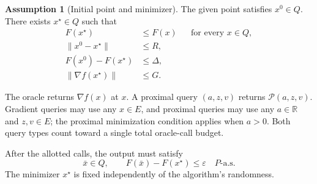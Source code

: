 \documentclass[10pt]{article}
\theoremstyle{definition}
\newtheorem{assumption}{Assumption}
\begin{document}
\begin{assumption}[Initial point and minimizer]
The given point satisfies $x^0\in Q$. There exists $x^\star\in Q$ such that
\[
\begin{aligned}
F(x^\star)&\leq F(x) &&\text{for every }x\in Q,\\
\|x^0-x^\star\|&\leq R,\\
F(x^0)-F(x^\star)&\leq\Delta,\\
\|\nabla f(x^\star)\|&\leq G.
\end{aligned}
\]
\end{assumption}

The oracle returns $\nabla f(x)$ at $x$. A proximal query $(a,z,v)$ returns $\mathcal{P}(a,z,v)$. Gradient queries may use any $x\in E$, and proximal queries may use any $a\in\mathbb{R}$ and $z,v\in E$; the proximal minimization condition applies when $a>0$. Both query types count toward a single total oracle-call budget.

After the allotted calls, the output must satisfy
\[
\bar{x}\in Q,
\qquad F(\bar{x})-F(x^\star)\leq\varepsilon
\quad P\text{-a.s.}
\]
The minimizer $x^\star$ is fixed independently of the algorithm's randomness.
\end{document}
